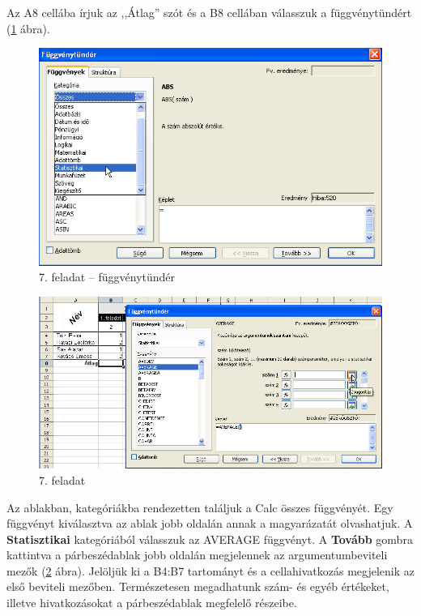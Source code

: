 Az A8 cellába írjuk az ,,Átlag''
szót és a B8 cellában válasszuk a függvénytündért 
(\ref{7-feladatFüggvény} ábra).

\begin{figure}[!h]
\begin{center}
\includegraphics[width=13.999cm]{oocalcv1-img37.png}
\caption{7. feladat --  függvénytündér}\label{7-feladatFüggvény}
\end{center}
\end{figure}

\begin{figure}[!h]
\begin{center}
\includegraphics[width=15.999cm]{oocalcv1-img38.png}
\caption{7. feladat }\label{7-feladatArgumentum}
\end{center}
\end{figure}

Az ablakban, kategóriákba rendezetten találjuk a Calc összes
függvényét. Egy függvényt kiválasztva az ablak jobb
oldalán annak a magyarázatát olvashatjuk. A \textbf{Statisztikai}
kategóriából válasszuk az AVERAGE függvényt. A
\textbf{Tovább} gombra kattintva a párbeszédablak jobb oldalán
megjelennek az argumentumbeviteli mezők (\ref{7-feladatArgumentum} ábra).
Jelöljük ki a B4:B7 tartományt és a cellahivatkozás megjelenik az első
beviteli mezőben. Természetesen megadhatunk szám- és egyéb
értékeket, illetve hivatkozásokat a párbeszédablak megfelelő részeibe.  

